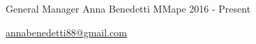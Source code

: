 \begin{cventries}
  \cventry
    {General Manager} %
    {Anna Benedetti} %
    {MMape} %
    {2016 - Present} %
    {
      \begin{cvitems} %
        \item {\href{mailto:annabenedetti88@gmail.com}{annabenedetti88@gmail.com}}
      \end{cvitems}
    }
 
\end{cventries}
